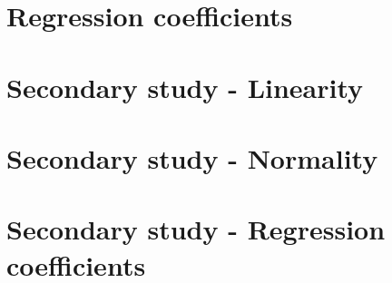 \documentclass{sigchi}
\begin{document}
\section{Regression coefficients} %
\label{sec:regression_coefficients}
\hfill \break

\clearpage

\section{Secondary study - Linearity}
\label{app:sec_linearity}
\hfill \break

\clearpage

\section{Secondary study - Normality} %
\label{sec:sec_normality}
\hfill \break

\clearpage

\section{Secondary study - Regression coefficients}
\label{sec:sec_regression_coefficients}
\hfill \break

\clearpage


\end{document}
